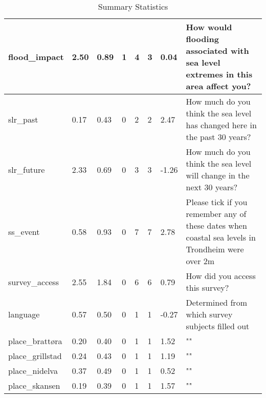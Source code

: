 \documentclass{article}
\begin{document}
\begin{center}
\begin{table}[!ht]
\begin{tabular}{|l|l|l|l|l|l|l|l|}
        flood\_impact & 2.50 & 0.89 & 1 & 4 & 3 & 0.04 & How would flooding associated with sea level extremes in this area affect you? \\ \hline
        slr\_past & 0.17 & 0.43 & 0 & 2 & 2 & 2.47 & How much do you think the sea level has changed here in the past 30 years? \\ \hline
        slr\_future & 2.33 & 0.69 & 0 & 3 & 3 & -1.26 & How much do you think the sea level will change in the next 30 years? \\ \hline
        ss\_event & 0.58 & 0.93 & 0 & 7 & 7 & 2.78 & Please tick if you remember any of these dates when coastal sea levels in Trondheim were over 2m \\ \hline
        survey\_access & 2.55 & 1.84 & 0 & 6 & 6 & 0.79 & How did you access this survey? \\ \hline
        language & 0.57 & 0.50 & 0 & 1 & 1 & -0.27 & Determined from which survey subjects filled out \\ \hline
        place\_brattøra & 0.20 & 0.40 & 0 & 1 & 1 & 1.52 & "" \\ \hline
        place\_grillstad & 0.24 & 0.43 & 0 & 1 & 1 & 1.19 & "" \\ \hline
        place\_nidelva & 0.37 & 0.49 & 0 & 1 & 1 & 0.52 & "" \\ \hline
        place\_skansen & 0.19 & 0.39 & 0 & 1 & 1 & 1.57 & "" \\ \hline
    \end{tabular}
    \caption{Summary Statistics}
\label{table:summary_stats}
\end{table}
\end{center}
\end{document}
